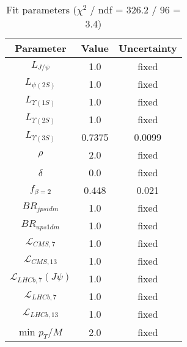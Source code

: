 \begin{table}[h!]
\centering
\begin{tabular}{c|c|c}
Parameter & Value & Uncertainty \\
\hline
$L_{J/\psi}$ & 1.0 & fixed \\
$L_{\psi(2S)}$ & 1.0 & fixed \\
$L_{\Upsilon(1S)}$ & 1.0 & fixed \\
$L_{\Upsilon(2S)}$ & 1.0 & fixed \\
$L_{\Upsilon(3S)}$ & 0.7375 & 0.0099 \\
$\rho$ & 2.0 & fixed \\
$\delta$ & 0.0 & fixed \\
$f_{\beta=2}$ & 0.448 & 0.021 \\
$BR_{jpsidm}$ & 1.0 & fixed \\
$BR_{ups1dm}$ & 1.0 & fixed \\
$\mathcal L_{CMS,7}$ & 1.0 & fixed \\
$\mathcal L_{CMS,13}$ & 1.0 & fixed \\
$\mathcal L_{LHCb,7}(J\psi)$ & 1.0 & fixed \\
$\mathcal L_{LHCb,7}$ & 1.0 & fixed \\
$\mathcal L_{LHCb,13}$ & 1.0 & fixed \\
min $p_T/M$ & 2.0 & fixed \\
\end{tabular}
\caption{Fit parameters ($\chi^2$ / ndf = 326.2 / 96 = 3.4)}
\end{table}
